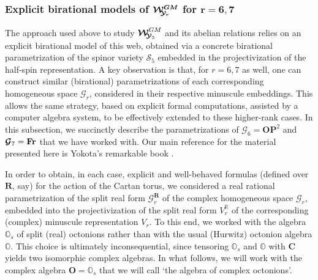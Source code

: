 \documentclass[11pt]{amsart}
\newcommand{\sk}{\smallskip}
\begin{document}
\subsubsection{\bf Explicit birational models of $\boldsymbol{{\mathcal W}^{GM}_{\hspace{-0.1cm} {\mathcal Y}_r}}$ for $\boldsymbol{r=6,7}$}
\label{SS:Explicit-birational-models}
The approach used above to study $\boldsymbol{\mathcal W}^{GM}_{\hspace{-0.1cm} \boldsymbol{\mathcal Y}_5}$ and its abelian relations relies on an explicit birational model of this web, obtained via a concrete birational parametrization of the spinor variety $\mathcal{S}_5$ embedded in the projectivization of the half-spin representation.  A key observation is that, for $r = 6,7$ as well, one can construct similar (birational) parametrizations of each corresponding homogeneous space $\boldsymbol{\mathcal G}_r$, considered in their respective minuscule embeddings. This allows the same strategy, based on explicit formal computations, assisted by a computer algebra system, to be effectively extended to these higher-rank cases. In this subsection, we succinctly describe the parametrizations  of $\boldsymbol{\mathcal G}_6=\mathbf O\mathbf P^2$ and  $\boldsymbol{\mathcal G}_7={\bf Fr}$ that we have worked with.  Our main reference for the material presented here is Yokota's remarkable book \cite{Yokota}. \sk


In order to obtain, in each case, explicit and well-behaved formulas (defined over ${\mathbf R}$, say) for the action of the Cartan torus, we considered a real rational parametrization of the split real form $\boldsymbol{\mathcal G}_r^{\mathbf R}$ of the complex homogeneous space $\boldsymbol{\mathcal G}_r$, embedded into the projectivization of the split real form $V^\mathbb{R}_r$ of the corresponding (complex) minuscule representation $V_r$.
To this end, we worked with the algebra ${\mathbb O}_s$ of split (real) octonions rather than with the usual (Hurwitz) octonion algebra $\mathbb{O}$. This choice is ultimately inconsequential, since tensoring $\mathbb{O}_s$ and $\mathbb{O}$ with $\mathbf{C}$ yields two isomorphic complex algebras.
In what follows, we will work with the complex algebra 
$\mathbf O=\mathbb O_s$ that we will call 
`the algebra of complex octonions'. \sk
\end{document}
